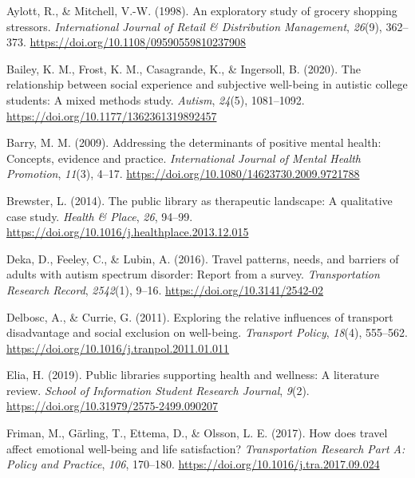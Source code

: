 \documentclass[
  letterpaper,
  number,
  review,
  3p]{elsarticle}
\newlength{\cslhangindent}
\newenvironment{CSLReferences}[2] %
 {\begin{list}{}{%
  \setlength{\itemindent}{0pt}
  \setlength{\leftmargin}{0pt}
  \setlength{\parsep}{0pt}
  \ifodd #1
   \setlength{\leftmargin}{\cslhangindent}
   \setlength{\itemindent}{-1\cslhangindent}
  \fi
  \setlength{\itemsep}{#2\baselineskip}}}
 {\end{list}}
\begin{document}

\label{refs}
\begin{CSLReferences}{1}{0}
Aylott, R., \& Mitchell, V.-W. (1998). An exploratory study of grocery
shopping stressors. \emph{International Journal of Retail \&
Distribution Management}, \emph{26}(9), 362--373.
\url{https://doi.org/10.1108/09590559810237908}

Bailey, K. M., Frost, K. M., Casagrande, K., \& Ingersoll, B. (2020).
The relationship between social experience and subjective well-being in
autistic college students: {A} mixed methods study. \emph{Autism},
\emph{24}(5), 1081--1092. \url{https://doi.org/10.1177/1362361319892457}

Barry, M. M. (2009). Addressing the determinants of positive mental
health: {Concepts}, evidence and practice. \emph{International Journal
of Mental Health Promotion}, \emph{11}(3), 4--17.
\url{https://doi.org/10.1080/14623730.2009.9721788}

Brewster, L. (2014). The public library as therapeutic landscape: {A}
qualitative case study. \emph{Health \& Place}, \emph{26}, 94--99.
\url{https://doi.org/10.1016/j.healthplace.2013.12.015}

Deka, D., Feeley, C., \& Lubin, A. (2016). Travel patterns, needs, and
barriers of adults with autism spectrum disorder: {Report} from a
survey. \emph{Transportation Research Record}, \emph{2542}(1), 9--16.
\url{https://doi.org/10.3141/2542-02}

Delbosc, A., \& Currie, G. (2011). Exploring the relative influences of
transport disadvantage and social exclusion on well-being.
\emph{Transport Policy}, \emph{18}(4), 555--562.
\url{https://doi.org/10.1016/j.tranpol.2011.01.011}

Elia, H. (2019). Public libraries supporting health and wellness: {A}
literature review. \emph{School of Information Student Research
Journal}, \emph{9}(2). \url{https://doi.org/10.31979/2575-2499.090207}

Friman, M., Gärling, T., Ettema, D., \& Olsson, L. E. (2017). How does
travel affect emotional well-being and life satisfaction?
\emph{Transportation Research Part A: Policy and Practice}, \emph{106},
170--180. \url{https://doi.org/10.1016/j.tra.2017.09.024}


\end{CSLReferences}
\end{document}
